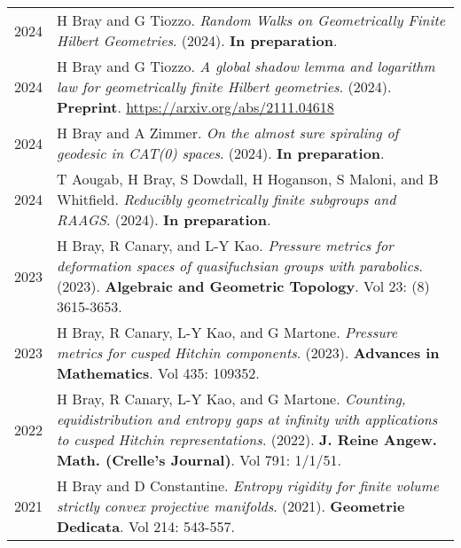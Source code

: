 
    \medskip


    \medskip
    
    \begin{center}
    {
    \renewcommand{\arraystretch}{1.5}
    \begin{longtable}{p{}  p{}}
    
2024 & 
        H Bray and G Tiozzo. \textit{Random Walks on Geometrically Finite Hilbert Geometries}. (2024). 
         \textbf{In preparation}. \\ 

2024 & 
        H Bray and G Tiozzo. \textit{A global shadow lemma and logarithm law for geometrically finite Hilbert geometries}. (2024). 
         \textbf{Preprint}. \url{https://arxiv.org/abs/2111.04618}\\ 

2024 & 
        H Bray and A Zimmer. \textit{On the almost sure spiraling of geodesic in CAT(0) spaces}. (2024). 
         \textbf{In preparation}. \\ 

2024 & 
        T Aougab, H Bray, S Dowdall, H Hoganson, S Maloni, and B Whitfield. \textit{Reducibly geometrically finite subgroups and RAAGS}. (2024). 
         \textbf{In preparation}. \\ 

2023 & 
        H Bray, R Canary, and L-Y Kao. \textit{Pressure metrics for deformation spaces of quasifuchsian groups with parabolics}. (2023). 
        \textbf{Algebraic and Geometric Topology}. Vol 23: (8) 3615-3653.\\ 

2023 & 
        H Bray, R Canary, L-Y Kao, and G Martone. \textit{Pressure metrics for cusped Hitchin components}. (2023). 
        \textbf{Advances in Mathematics}. Vol 435: 109352.\\ 

2022 & 
        H Bray, R Canary, L-Y Kao, and G Martone. \textit{Counting, equidistribution and entropy gaps at infinity with applications to cusped Hitchin representations}. (2022). 
        \textbf{J. Reine Angew. Math. (Crelle's Journal)}. Vol 791: 1/1/51.\\ 

2021 & 
        H Bray and D Constantine. \textit{Entropy rigidity for finite volume strictly convex projective manifolds}. (2021). 
        \textbf{Geometrie Dedicata}. Vol 214: 543-557.\\ 


\end{longtable}}
\end{center}
